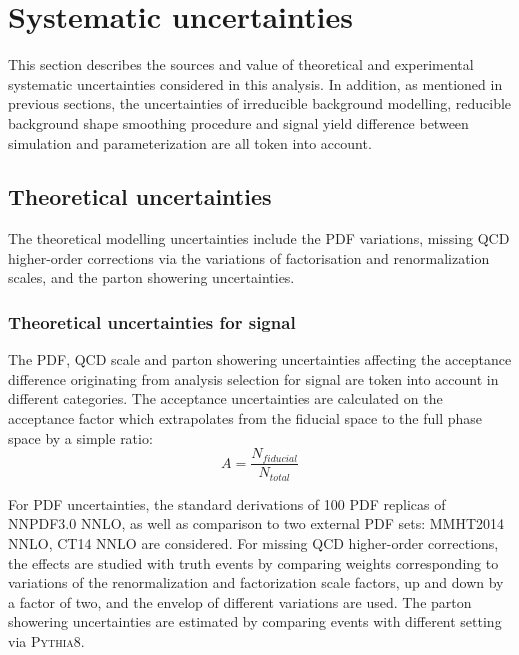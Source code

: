 \section{Systematic uncertainties}
\label{sec:hmhzz_sys}

This section describes the sources and value of theoretical and experimental systematic uncertainties considered in this analysis.
In addition, as mentioned in previous sections, the uncertainties of irreducible background modelling, reducible background shape smoothing procedure and signal yield difference between simulation and parameterization are all token into account.

\subsection{Theoretical uncertainties}

The theoretical modelling uncertainties include the PDF variations, missing QCD higher-order corrections via the variations of factorisation and renormalization scales,
and the parton showering uncertainties.

\subsubsection{Theoretical uncertainties for signal}
\label{sec:hmhzz_theo_signal}

The PDF, QCD scale and parton showering uncertainties affecting the acceptance difference originating from analysis selection for signal are token into account in different categories.
The acceptance uncertainties are calculated on the acceptance factor which extrapolates from the fiducial space to the full phase space by a simple ratio:
\begin{equation}
        A = \frac{N_{fiducial}}{N_{total}}
\end{equation}

For PDF uncertainties, the standard derivations of 100 PDF replicas of NNPDF3.0 NNLO, as well as comparison to two external PDF sets: MMHT2014 NNLO, CT14 NNLO are considered.
For missing QCD higher-order corrections, the effects are studied with truth events by comparing weights corresponding to
variations of the renormalization and factorization scale factors, up and down by a factor of two, and the envelop of different variations are used.
The parton showering uncertainties are estimated by comparing events with different setting via \textsc{Pythia8}.

